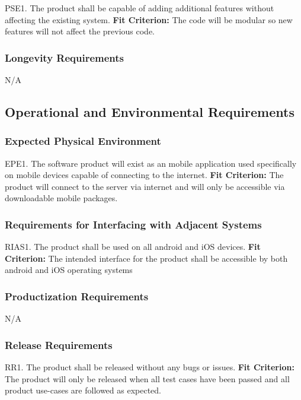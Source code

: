 \documentclass[12pt, titlepage]{article}
\begin{document}
PSE1. The product shall be capable of adding additional features without affecting the existing system.
	\textbf{Fit Criterion:} The code will be modular so new features will not affect the previous 
code.

\subsubsection{Longevity Requirements}

N/A

\subsection{Operational and Environmental Requirements}

\subsubsection{Expected Physical Environment}

EPE1. The software product will exist as an mobile application used specifically on mobile devices capable of connecting to the internet. 
	\textbf{Fit Criterion:} The product will connect to the server via internet and will only be accessible via downloadable mobile packages.

\subsubsection{Requirements for Interfacing with Adjacent Systems}

RIAS1. The product shall be used on all android and iOS devices.
	\textbf{Fit Criterion:} The intended interface for the product shall be accessible by both android 
and iOS operating systems

\subsubsection{Productization Requirements}

N/A

\subsubsection{Release Requirements}

RR1. The product shall be released without any bugs or issues.
	\textbf{Fit Criterion:} The product will only be released when all test cases have been passed and all product use-cases are followed as expected.\\
\end{document}
